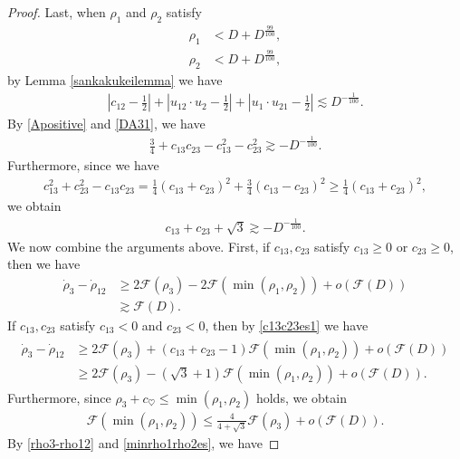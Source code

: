 \documentclass[10pt,a4paper]{amsart}
\begin{document}
\begin{proof}
Last, when $\rho_1$ and $\rho_2$ satisfy
\begin{align*}
\rho_1&<D+D^{\frac{99}{100}},
\\
\rho_2&<D+D^{\frac{99}{100}},
\end{align*}
by Lemma \ref{sankakukeilemma} we have
\begin{align}\label{DA31}
\left|c_{12}-\frac{1}{2}\right|+\left|u_{12}\cdot u_2-\frac{1}{2}\right|+\left|u_1\cdot u_{21}-\frac{1}{2}\right|\lesssim D^{-\frac{1}{100}}.
\end{align}
By \eqref{Apositive} and \eqref{DA31}, we have
\begin{align*}
\frac{3}{4}+c_{13}c_{23}-c_{13}^2-c_{23}^2\gtrsim -D^{-\frac{1}{100}}.
\end{align*}
Furthermore, since we have
\begin{align*}
c_{13}^2+c_{23}^2-c_{13}c_{23}=\frac{1}{4}\left(c_{13}+c_{23}\right)^2+\frac{3}{4}\left(c_{13}-c_{23}\right)^2\geq \frac{1}{4}\left(c_{13}+c_{23}\right)^2,
\end{align*}
we obtain
\begin{align}\label{c13c23es1}
c_{13}+c_{23}+\sqrt{3}\gtrsim -D^{-\frac{1}{100}}.
\end{align}
We now combine the arguments above. First, if $c_{13}, c_{23}$ satisfy $c_{13}\geq 0$ or $c_{23}\geq 0$, then we have
\begin{align*}
\dot{\rho}_3-\dot{\rho}_{12}&\geq 2\mathcal{F}(\rho_3)-2\mathcal{F}(\min{(\rho_1,\rho_2)})+o\left(\mathcal{F}(D)\right)
\\
&\gtrsim \mathcal{F}(D).
\end{align*}
If $c_{13}, c_{23}$ satisfy $c_{13}<0$ and $c_{23}<0$, then by \eqref{c13c23es1} we have
\begin{align}\label{rho3-rho12}
\begin{aligned}
\dot{\rho}_3-\dot{\rho}_{12}&\geq 2\mathcal{F}(\rho_3)+(c_{13}+c_{23}-1)\mathcal{F}(\min{(\rho_1,\rho_2)})+o\left(\mathcal{F}(D)\right)
\\
&\geq 2\mathcal{F}(\rho_3)-(\sqrt{3}+1)\mathcal{F}(\min{(\rho_1,\rho_2)})+o\left(\mathcal{F}(D)\right).
\end{aligned}
\end{align}
Furthermore, since $\rho_3+c_{\heartsuit}\leq \min{(\rho_1,\rho_2)}$ holds, we obtain
\begin{align}\label{minrho1rho2es}
\mathcal{F}(\min{(\rho_1,\rho_2)})\leq \frac{4}{4+\sqrt{3}}\mathcal{F}(\rho_3)+o\left(\mathcal{F}(D)\right).
\end{align}
By \eqref{rho3-rho12} and \eqref{minrho1rho2es}, we have

\end{proof}
\end{document}
